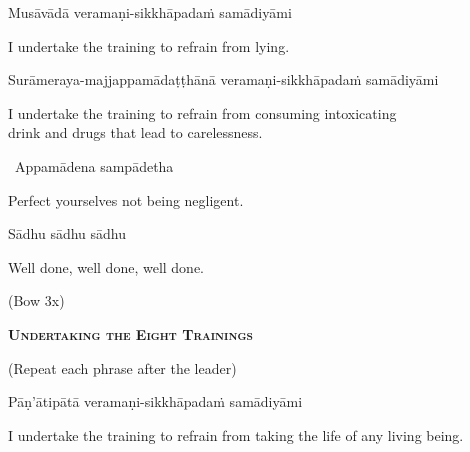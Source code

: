 Musāvādā veramaṇi-sikkhāpadaṁ samādiyāmi

\begin{english}
  I undertake the training to refrain from lying.
\end{english}

\begin{pali-hang}
  Surāmeraya-majjappamādaṭṭhānā veramaṇi-sikkhāpadaṁ samādiyāmi
\end{pali-hang}

\begin{english-hang}
  I undertake the training to refrain from consuming intoxicating\\
  drink and drugs that lead to carelessness.\makeatletter\hyperlink{endnote140-appendix}\makeatother
\end{english-hang}


\begin{leader-only}
  \anglebracketleft\ \hspace{-0.5mm}Appamādena sampādetha \hspace{-0.5mm}\anglebracketright\
\end{leader-only}

\begin{english}
  Perfect yourselves not being negligent.
\end{english}

Sādhu sādhu sādhu

\begin{english}
  Well done, well done, well done.
\end{english}

\begin{center}
  (Bow 3x)
\end{center}

\clearpage

\begin{center}
  \textbf{\textsc{Undertaking the Eight Trainings}}
\end{center}

\begin{center}
  (Repeat each phrase after the leader)
\end{center}

Pāṇ'ātipātā veramaṇi-sikkhāpadaṁ samādiyāmi

\begin{english-hang}
  I undertake the training to refrain from taking the life of any living being.
\end{english-hang}

